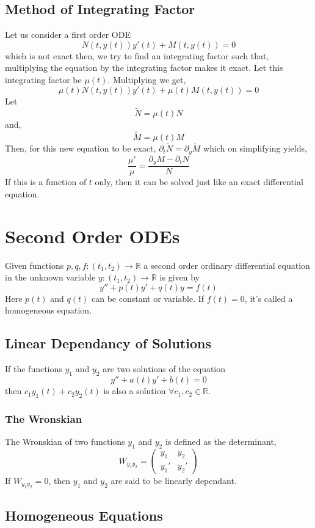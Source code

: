 \documentclass[10pt]{article}
\begin{document}
        \subsection{Method of Integrating Factor}
            Let us consider a first order ODE $$N(t, y(t))y'(t) + M(t, y(t)) = 0$$ which is not exact
            then, we try to find an integrating factor such that, multiplying the equation by the integrating factor makes it exact. Let this integrating factor be $\mu(t)$. Multiplying we get,
            $$\mu(t)N(t, y(t))y'(t) + \mu(t)M(t, y(t)) = 0$$
            Let 
            $$\tilde{N} = \mu(t)N$$ and,
            $$\tilde{M} = \mu(t)M$$
            Then, for this new equation to be exact, $\partial_t\tilde{N} = \partial_y\tilde{M}$ which on simplifying yields,
            $$\frac{\mu'}{\mu} = \frac{\partial_yM-\partial_tN}{N}$$
            If this is a function of $t$ only, then it can be solved just like an exact differential equation.
    \section{Second Order ODEs}
        Given functions $p,q,f : (t_1, t_2) \to \mathbb{R}$ a second order ordinary differential equation in the unknown variable $y : (t_1, t_2) \to \mathbb{R}$ is given by $$y'' + p(t)y' + q(t)y = f(t)$$ Here $p(t)$ and $q(t)$ can be constant or variable. If $f(t) = 0$, it's called a homogeneous equation.
        \subsection{Linear Dependancy of Solutions}
            If the functions $y_1$ and $y_2$ are two solutions of the equation 
            $$y'' + a(t)y' + b(t) = 0$$
            then $c_1y_1(t) + c_2y_2(t)$ is also a solution $\forall c_1, c_2 \in \mathbb{R}$.  
            \subsubsection{The Wronskian}
            The Wronskian of two functions $y_1$ and $y_2$ is defined as the determinant,
            $$
            W_{y_1y_2} = 
            \begin{pmatrix}
            y_1  & y_2 \\
            y_1' & y_2'
            \end{pmatrix}
            $$
            If $W_{y_1y_2}=0$, then $y_1$ and $y_2$ are said to be linearly dependant.
        \subsection{Homogeneous Equations}
\end{document}
